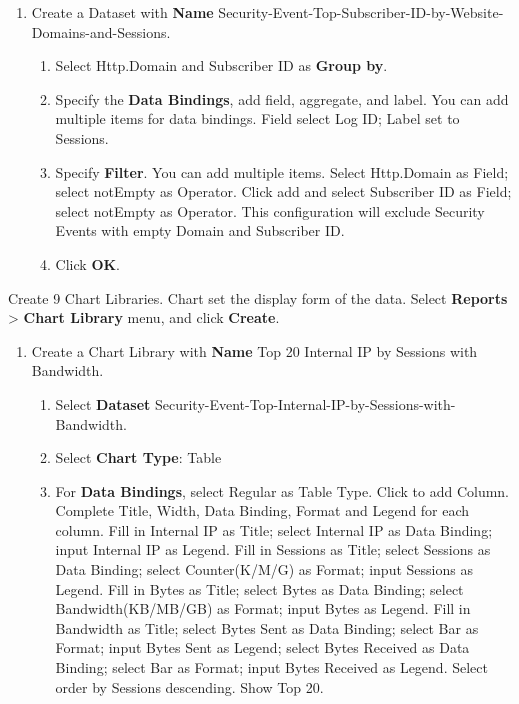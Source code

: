\begin{description}
\begin{enumerate}
\begin{enumerate}
            \item	Specify \textbf{Filter}. Select Http.Domain as Field; select notEmpty as Operator. This configuration will exclude Security Events with empty Domain.
            \item	Click \textbf{OK}.
        \end{enumerate}
        \item Create a Dataset with \textbf{Name} Security-Event-Top-Subscriber-ID-by-Website-Domains-and-Sessions.
        \begin{enumerate}
            \item	Select Http.Domain and Subscriber ID as \textbf{Group by}. 
            \item	Specify the \textbf{Data Bindings}, add field, aggregate, and label. You can add multiple items for data bindings. Field select Log ID; Label set to Sessions.
            \item	Specify \textbf{Filter}. You can add multiple items. Select Http.Domain as Field; select notEmpty as Operator. Click add and select Subscriber ID as Field; select notEmpty as Operator. This configuration will exclude Security Events with empty Domain and Subscriber ID.
            \item	Click \textbf{OK}.
        \end{enumerate}
    \end{enumerate}
    \item[STEP 2.]	Create 9 Chart Libraries. Chart set the display form of the data. Select \textbf{Reports} > \textbf{Chart Library} menu, and click \textbf{Create}.
    \begin{enumerate}
        \item Create a Chart Library with \textbf{Name} Top 20 Internal IP by Sessions with Bandwidth.
        \begin{enumerate}
            \item	Select \textbf{Dataset} Security-Event-Top-Internal-IP-by-Sessions-with-Bandwidth.
            \item	Select \textbf{Chart Type}: Table
            \item	For \textbf{Data Bindings}, select Regular as Table Type. Click to add Column. Complete Title, Width, Data Binding, Format and Legend for each column. Fill in Internal IP as Title; select Internal IP as Data Binding; input Internal IP as Legend. Fill in Sessions as Title; select Sessions as Data Binding; select Counter(K/M/G) as Format; input Sessions as Legend. Fill in Bytes as Title; select Bytes as Data Binding; select Bandwidth(KB/MB/GB) as Format; input Bytes as Legend. Fill in Bandwidth as Title; select Bytes Sent as Data Binding; select Bar as Format; input Bytes Sent as Legend; select Bytes Received as Data Binding; select Bar as Format; input Bytes Received as Legend. Select order by Sessions descending. Show Top 20.

\end{enumerate}
\end{enumerate}
\end{description}
